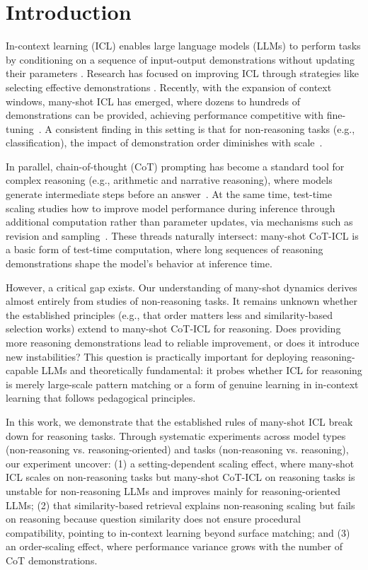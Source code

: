 \documentclass{llmxive}
\begin{document}
\section{Introduction}
In-context learning (ICL) enables large language models (LLMs) to perform tasks by conditioning on a sequence of input-output demonstrations without updating their parameters \cite{min-etal-2022-rethinking, vonoswald2023transformerslearnincontextgradient}. Research has focused on improving ICL through strategies like selecting effective demonstrations \cite{sorensen-etal-2022-information, liu-etal-2022-makes, wu-etal-2023-self}. Recently, with the expansion of context windows, many-shot ICL has emerged, where dozens to hundreds of demonstrations can be provided, achieving performance competitive with fine-tuning~\cite{agarwal2024manyshot, bertsch-etal-2025-context}. A consistent finding in this setting is that for non-reasoning tasks (e.g., classification), the impact of demonstration order diminishes with scale~\cite{bertsch-etal-2025-context, baek2025revisitingincontextlearninglong}.

In parallel, chain-of-thought (CoT) prompting has become a standard tool for complex reasoning (e.g., arithmetic and narrative reasoning), where models generate intermediate steps before an answer~\cite{wei2022chain, kojima2022large}.
At the same time, test-time scaling studies how to improve model performance during inference through additional computation rather than parameter updates, via mechanisms such as revision and sampling~\cite{snell2025scaling, lin2024the}.
These threads naturally intersect: many-shot CoT-ICL is a basic form of test-time computation, where long sequences of reasoning demonstrations shape the model's behavior at inference time.

However, a critical gap exists. Our understanding of many-shot dynamics derives almost entirely from studies of non-reasoning tasks. It remains unknown whether the established principles (e.g., that order matters less and similarity-based selection works) extend to many-shot CoT-ICL for reasoning. Does providing more reasoning demonstrations lead to reliable improvement, or does it introduce new instabilities? This question is practically important for deploying reasoning-capable LLMs and theoretically fundamental: it probes whether ICL for reasoning is merely large-scale pattern matching or a form of genuine learning in in-context learning that follows pedagogical principles.

In this work, we demonstrate that the established rules of many-shot ICL break down for reasoning tasks. Through systematic experiments across model types (non-reasoning vs. reasoning-oriented) and tasks (non-reasoning vs. reasoning), our experiment uncover: (1) a setting-dependent scaling effect, where many-shot ICL scales on non-reasoning tasks but many-shot CoT-ICL on reasoning tasks is unstable for non-reasoning LLMs and improves mainly for reasoning-oriented LLMs; (2) that similarity-based retrieval explains non-reasoning scaling but fails on reasoning because question similarity does not ensure procedural compatibility, pointing to in-context learning beyond surface matching; and (3) an order-scaling effect, where performance variance grows with the number of CoT demonstrations.
\end{document}
